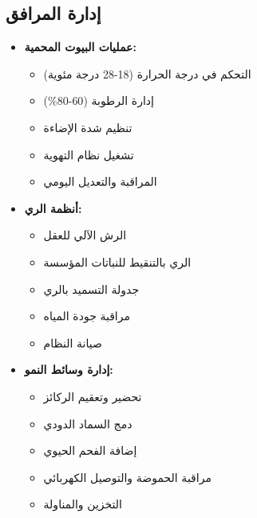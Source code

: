 \subsection{إدارة المرافق}
\begin{itemize}
    \item \textbf{عمليات البيوت المحمية:}
    \begin{itemize}
        \item التحكم في درجة الحرارة (18-28 درجة مئوية)
        \item إدارة الرطوبة (60-80\%)
        \item تنظيم شدة الإضاءة
        \item تشغيل نظام التهوية
        \item المراقبة والتعديل اليومي
    \end{itemize}
    
    \item \textbf{أنظمة الري:}
    \begin{itemize}
        \item الرش الآلي للعقل
        \item الري بالتنقيط للنباتات المؤسسة
        \item جدولة التسميد بالري
        \item مراقبة جودة المياه
        \item صيانة النظام
    \end{itemize}
    
    \item \textbf{إدارة وسائط النمو:}
    \begin{itemize}
        \item تحضير وتعقيم الركائز
        \item دمج السماد الدودي
        \item إضافة الفحم الحيوي
        \item مراقبة الحموضة والتوصيل الكهربائي
        \item التخزين والمناولة
    \end{itemize}
\end{itemize}

